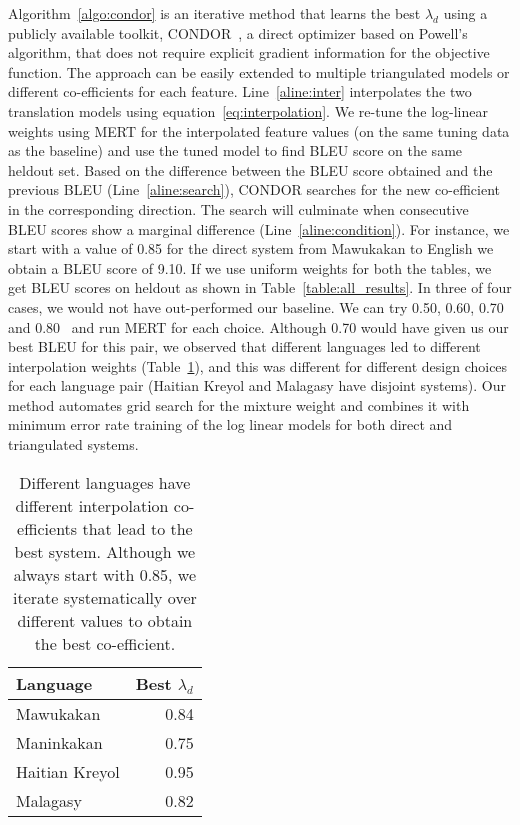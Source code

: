 \documentclass[11pt]{article}
\begin{document}
	Algorithm~\ref{algo:condor} is an iterative method that learns the best $\lambda_{d}$  using a publicly available toolkit, CONDOR~\cite{Berghen:05}, a direct optimizer based on Powell's algorithm, that does not require explicit gradient information for the objective function. The approach can be easily extended to multiple triangulated models or different co-efficients for each feature. Line~\ref{aline:inter} interpolates the two translation models using equation~\eqref{eq:interpolation}. We re-tune the log-linear weights using MERT for the interpolated feature values (on the same tuning data as the baseline) and use the tuned model to find BLEU score on the same heldout set. Based on the difference between the BLEU score obtained and the previous BLEU (Line~\ref{aline:search}), CONDOR searches for the new co-efficient in the corresponding direction. The search will culminate when consecutive BLEU scores show a marginal difference (Line~\ref{aline:condition}). For instance, we start with a value of 0.85 for the direct system from Mawukakan to English we obtain a BLEU score of 9.10.  If we use uniform weights for both the tables, we get BLEU scores on heldout as shown in Table~\ref{table:all_results}. In three of four cases, we would not have out-performed our baseline. We can try 0.50, 0.60, 0.70 and 0.80~\cite{Nakov:12} and run MERT for each choice. Although 0.70 would have given us our best BLEU for this pair, we observed that different languages led to different interpolation weights (Table~\ref{table:condor_run}), and this was different for different design choices for each language pair (Haitian Kreyol and Malagasy have disjoint systems). Our method automates grid search for the mixture weight and combines it with minimum error rate training of the log linear models for both direct and triangulated systems.

	\begin{table}
        \centering
        \small
		{
		\begin{tabular}{lr}
		\hline
		Language & Best $\lambda_{d}$ \\
		\hline
		Mawukakan & 0.84 \\
		Maninkakan & 0.75 \\
		Haitian Kreyol & 0.95 \\
		Malagasy & 0.82 \\
		\hline
		\end{tabular}
        }
		\caption{Different languages have different interpolation co-efficients that lead to the best system. Although we always start with 0.85, we iterate systematically over different values to obtain the best co-efficient.}
		\label{table:condor_run}
	\end{table}
\end{document}
